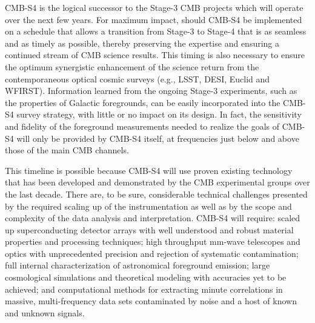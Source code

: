 %


CMB-S4 is the logical successor to the Stage-3 CMB projects which will operate over the next few years. For maximum impact, should CMB-S4 be implemented on a schedule that allows a transition from Stage-3 to Stage-4 that is as seamless and as timely as possible, thereby preserving the expertise and ensuring a continued stream of CMB science results. This timing is also necessary to ensure the optimum synergistic enhancement of the science return from the contemporaneous optical cosmic surveys (e.g., LSST, DESI, Euclid and WFIRST).   Information learned from the ongoing Stage-3 experiments, such as the properties of Galactic foregrounds, can be easily incorporated into the CMB-S4 survey strategy, with little or no impact on its design. In fact, the sensitivity and fidelity of the foreground measurements needed to realize the goals of CMB-S4 will only be provided by CMB-S4 itself, at frequencies just below and above those of the main CMB channels.

This timeline is possible because CMB-S4 will use proven existing technology that has been developed and demonstrated by the CMB experimental groups over the last decade. There are, to be sure, considerable technical challenges presented by the required scaling up of the instrumentation as well as by the scope and complexity of the data analysis and interpretation.  CMB-S4 will require: scaled up superconducting detector arrays with well understood and robust material properties and processing techniques; high throughput mm-wave telescopes and optics with unprecedented precision and rejection of systematic contamination; full internal characterization of astronomical foreground emission; large cosmological simulations and theoretical modeling with accuracies yet to be achieved; and computational methods for extracting minute correlations in massive, multi-frequency data sets contaminated by noise and a host of known and unknown signals. 


